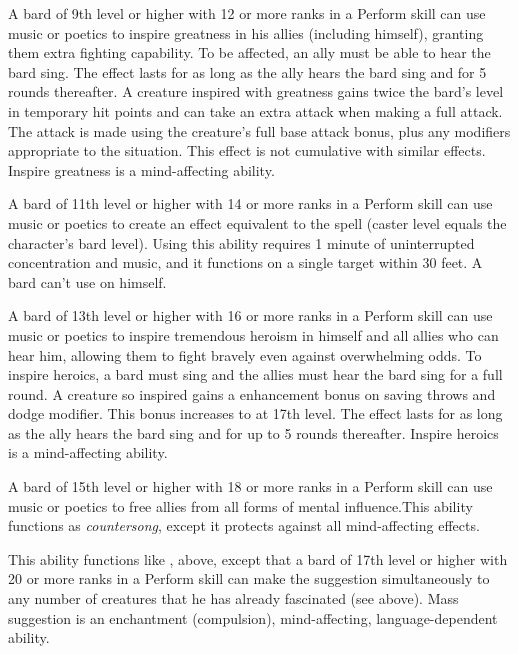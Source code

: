   A bard of 9th level or higher with 12 or more ranks
in a Perform skill can use music or poetics to inspire greatness
in his allies (including himself), granting them extra fighting capability. To be affected, an ally must be able to hear the bard sing. The effect lasts for as
long as the ally hears the bard sing and for 5 rounds thereafter. A
creature inspired with greatness gains twice the bard's level in temporary hit points and can take an extra attack when making a full attack. The attack is made using the creature's full base attack bonus, plus any modifiers appropriate to the situation. This effect is not cumulative with similar effects. Inspire greatness is a mind-affecting ability.

 A bard of 11th level or higher with 14 or more ranks in a Perform skill can use music or poetics to create an
effect equivalent to the  spell (caster level equals
the character's bard level). Using this ability requires 1 minute of
uninterrupted concentration and music, and it functions on a single
target within 30 feet. A bard can't use  on himself.

  A bard of 13th level or higher with 16 or more ranks in a Perform skill can use music or poetics to inspire tremendous heroism in himself and all allies who can hear him, allowing them to fight bravely even against overwhelming odds. To inspire heroics, a bard must sing and the allies must hear the bard sing for a full round. A creature so inspired gains a  enhancement bonus on saving throws and dodge modifier. This bonus increases to  at 17th level. The effect lasts for as long as the ally hears the bard sing and for up to 5 rounds thereafter. Inspire heroics is a mind-affecting ability.

  A bard of 15th level or higher with 18 or more ranks in a Perform skill can use music or poetics to free allies from all forms of mental influence.This ability functions as \emph{countersong}, except it protects against all mind-affecting effects.

 This ability functions like , above,
except that a bard of   17th level or higher with 20 or more ranks in a Perform skill  can make the suggestion simultaneously to any number
of creatures that he has already fascinated (see above). Mass suggestion
is an enchantment (compulsion), mind-affecting, language-dependent ability.

